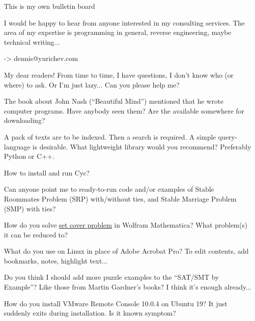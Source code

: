 
\begin{center}
\LARGE{} This is my own bulletin board \normalsize{}
\end{center}

I would be happy to hear from anyone interested in my consulting services.
The area of my expertise is programming in general, reverse engineering, maybe technical writing...

-> dennis@yurichev.com

\myhrule{}

My dear readers! From time to time, I have questions, I don't know who (or where) to ask.
Or I'm just lazy...
Can you please help me?

\myhrule{}

The book about John Nash (``Beautiful Mind'') mentioned that he wrote computer programs.
Have anybody seen them? Are the available somewhere for downloading?

\myhrule{}

A pack of texts are to be indexed. Then a search is required. A simple query-language is desirable.
What lightweight library would you recommend?
Preferably Python or C++.

\myhrule{}

How to install and run Cyc?

\myhrule{}

Can anyone point me to ready-to-run code and/or examples of
Stable Roommates Problem (SRP) with/without ties,
and Stable Marriage Problem (SMP) with ties?

\myhrule{}

How do you solve \href{https://en.wikipedia.org/wiki/Set_cover_problem}{set cover problem} in Wolfram Mathematica?
What problem(s) it can be reduced to?

\myhrule{}

What do you use on Linux in place of Adobe Acrobat Pro?
To edit contents, add bookmarks, notes, highlight text...

\myhrule{}

Do you think I should add more puzzle examples to the ``SAT/SMT by Example''?
Like those from Martin Gardner's books?
I think it's enough already...

\myhrule{}

How do you install VMware Remote Console 10.0.4 on Ubuntu 19? It just suddenly exits during installation.
Is it known symptom?

